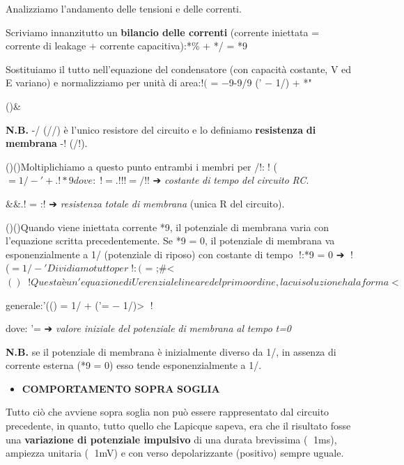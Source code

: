 \documentclass[12pt,a4paper]{book}
\begin{document}
Analizziamo l'andamento delle tensioni e delle correnti.

Scriviamo innanzitutto un \textbf{bilancio delle correnti }(corrente iniettata = corrente di leakage + corrente capacitiva):*\% + */ = *9

Sostituiamo il tutto nell'equazione del condensatore (con capacità costante, V ed E variano) e normalizziamo per unità di area:$! ($ = −9-9/9 (' − 1/) + *"

()\&

\textbf{N.B.}\textbf{ }-/ (//) è l'unico resistore del circuito e lo deﬁniamo \textbf{resistenza}\textbf{ }\textbf{di}\textbf{ }\textbf{membrana}\textbf{ }-! (/!).

()()Moltiplichiamo a questo punto entrambi i membri per /!:\textit{}! ($ = 1/ − ' + .!*9

dove: \textit{}! = .!!! = /!$! ➔ \textit{costante}\textit{ }\textit{di}\textit{ }\textit{tempo}\textit{ }\textit{del}\textit{ }\textit{circuito}\textit{ }\textit{RC}.

\&\&.! = :! ➔ \textit{resistenza}\textit{ }\textit{totale}\textit{ }\textit{di}\textit{ }\textit{membrana}\textit{ }(unica R del circuito).

()()Quando viene iniettata corrente *9, il potenziale di membrana varia con l'equazione scritta precedentemente. Se *9 = 0, il potenziale di membrana va esponenzialmente a 1/ (potenziale di riposo) con costante di tempo \textit{}!:*9 = 0 ➔ \textit{}! ($ = 1/ − '

Dividiamo tutto per \textit{}! :($ = ;\#<$

()\textit{}!

Questa è un'equazione diUerenziale lineare del primo ordine, la cui soluzione ha la forma

< $

generale:'(() = 1/ + ('= − 1/)> \textit{}!

dove:  '= ➔ \textit{valore}\textit{ }\textit{iniziale}\textit{ }\textit{del}\textit{ }\textit{potenziale}\textit{ }\textit{di}\textit{ }\textit{membrana}\textit{ }\textit{al}\textit{ }\textit{tempo}\textit{ }\textit{t=0}

\textbf{N.B. }se il potenziale di membrana è inizialmente diverso da 1/, in assenza di corrente esterna (*9 = 0) esso tende esponenzialmente a 1/.

\begin{itemize}
  \item \textbf{COMPORTAMENTO}\textbf{ }\textbf{SOPRA}\textbf{ }\textbf{SOGLIA}
\end{itemize}
Tutto ciò che avviene sopra soglia non può essere rappresentato dal circuito precedente, in quanto, tutto quello che Lapicque sapeva, era che il risultato fosse una \textbf{variazione di potenziale impulsivo }di una durata brevissima ( 1ms), ampiezza unitaria ( 1mV) e con verso depolarizzante (positivo) sempre uguale.
\end{document}
